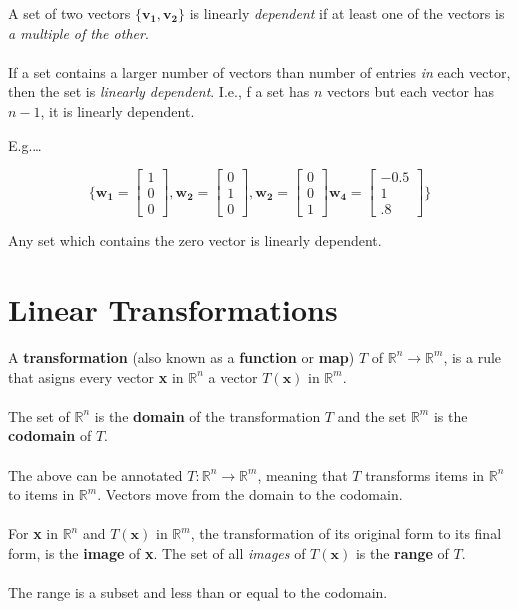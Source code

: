 \documentclass[12pt]{article}
\newcommand{\R}{\mathbb{R}}
\newcommand{\bt}[1]{\textbf{{#1}}}
\newcommand{\bm}[1]{\mathbf{{#1}}}
\newcommand{\mb}{\begin{bmatrix}}
\newcommand{\me}{\end{bmatrix}}
\begin{document}
A set of two vectors $\{\bm{v_1, v_2}\}$ is linearly \emph{dependent} if at least one of the vectors is \emph{a multiple of the other}. \\ \\

If a set contains a larger number of vectors than number of entries \emph{in} each vector, then the set is \emph{linearly dependent}. I.e., f a set has $n$
vectors but each vector has $n-1$, it is linearly dependent.

E.g.\dots

$$\{\bm{w_1} = \mb 1\\0\\0 \me, \bm{w_2} = \mb 0\\1\\0 \me, \bm{w_2} = \mb 0\\0\\1 \me \bm{w_4} = \mb -0.5\\1\\.8 \me\}$$

Any set which contains the zero vector is linearly dependent.

\section*{Linear Transformations}

A \bt{transformation} (also known as a \bt{function} or \bt{map}) $T$ of $\R^n \rightarrow \R^m$, is a rule that asigns every vector \bt{x} in $\R^n$
a vector $T(\bm{x})$ in $\R^m$. \\ \\

The set of $\R^n$ is the \textbf{domain} of the transformation $T$ and the set $\R^m$ is the \textbf{codomain} of $T$. \\ \\

The above can be annotated $T: \R^n \rightarrow \R^m$, meaning that $T$ transforms items in $\R^n$ to items in $\R^m$. Vectors move from the domain to the codomain. \\ \\

For \bt{x} in $\R^n$ and $T(\bt{x})$ in $\R^m$, the transformation of its original form to its final form, is the \bt{image} of \bt{x}. The set of all \emph{images} of $T(\bm{x})$ is the \bt{range} of $T$. \\ \\

The range is a subset and less than or equal to the codomain. \\ \\
\end{document}
